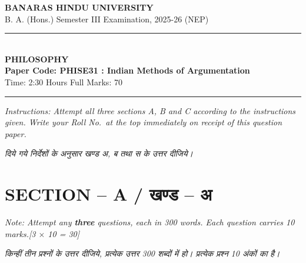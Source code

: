 \documentclass[11pt,a4paper]{article}
\newcommand{\pts}[1]{\hfill \textit{[#1]}}
\begin{document}
\begin{center}
  {\large\bfseries BANARAS HINDU UNIVERSITY}\\[2pt]
  {\normalsize B. A. (Hons.) Semester III Examination, 2025-26 (NEP)}\\[6pt]
  \rule{0.8\linewidth}{0.5pt}\\[6pt]
  {\large\bfseries PHILOSOPHY}\\[4pt]
  {\large\bfseries Paper Code: PHISE31 : Indian Methods of Argumentation}\\[4pt]
  {\normalsize Time: 2:30 Hours \hfill Full Marks: 70}
\end{center}
\rule{\linewidth}{0.4pt}
\smallskip

\noindent \textit{Instructions: Attempt all three sections A, B and C according to the instructions given. Write your Roll No.\ at the top immediately on receipt of this question paper.}

\smallskip
\noindent \textit{दिये गये निर्देशों के अनुसार खण्ड अ, ब तथा स के उत्तर दीजिये।}

\bigskip

\section*{SECTION -- A / खण्ड -- अ}
\noindent \textit{Note: Attempt any \textbf{three} questions, each in 300 words. Each question carries 10 marks.}\pts{3 $\times$ 10 = 30}

\noindent \textit{किन्हीं तीन प्रश्नों के उत्तर दीजिये, प्रत्येक उत्तर 300 शब्दों में हो। प्रत्येक प्रश्न 10 अंकों का है।}
\end{document}
